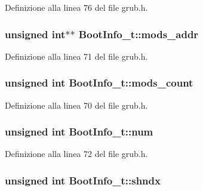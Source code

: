 Definizione alla linea 76 del file grub.\+h.

\hypertarget{structBootInfo__t_a1be510e25cd3a21bfd0d4d3b303e0543}{
\subsubsection[{mods\+\_\+addr}]{\setlength{\rightskip}{0pt plus 5cm}unsigned int$\ast$$\ast$ Boot\+Info\+\_\+t\+::mods\+\_\+addr}}\label{structBootInfo__t_a1be510e25cd3a21bfd0d4d3b303e0543}


Definizione alla linea 71 del file grub.\+h.

\hypertarget{structBootInfo__t_a178ef95a8fbd89ec018899b9ba241d92}{
\subsubsection[{mods\+\_\+count}]{\setlength{\rightskip}{0pt plus 5cm}unsigned int Boot\+Info\+\_\+t\+::mods\+\_\+count}}\label{structBootInfo__t_a178ef95a8fbd89ec018899b9ba241d92}


Definizione alla linea 70 del file grub.\+h.

\hypertarget{structBootInfo__t_a6a38dc50fe6f5719f544488a265b8cf1}{
\subsubsection[{num}]{\setlength{\rightskip}{0pt plus 5cm}unsigned int Boot\+Info\+\_\+t\+::num}}\label{structBootInfo__t_a6a38dc50fe6f5719f544488a265b8cf1}


Definizione alla linea 72 del file grub.\+h.

\hypertarget{structBootInfo__t_ab2c8b3b8778032a87c0c2fe73245e9e8}{
\subsubsection[{shndx}]{\setlength{\rightskip}{0pt plus 5cm}unsigned int Boot\+Info\+\_\+t\+::shndx}}\label{structBootInfo__t_ab2c8b3b8778032a87c0c2fe73245e9e8}



